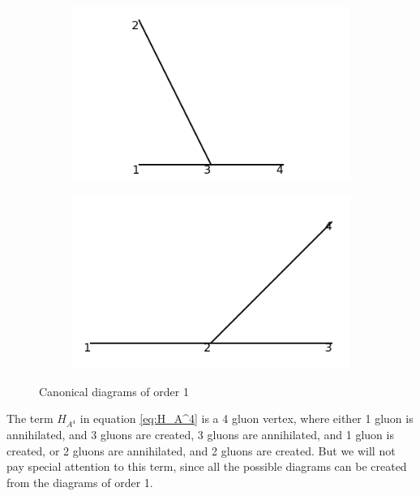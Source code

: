 \documentclass[11pt,a4paper,twoside,pdf]{article}
\numberwithin{equation}{section}
\begin{document}
\begin{figure}[h!]
    \centering
    \begin{subfigure}[t]{0.33\textwidth}
        \centering
        \includegraphics[width=\textwidth]{plots/canonical/order1/1.png}
        \caption{ }
    \end{subfigure}%
    \begin{subfigure}[t]{0.33\textwidth}
        \centering
        \includegraphics[width=\textwidth]{plots/canonical/order1/2.png}
        \caption{ }
    \end{subfigure}
    \caption{Canonical diagrams of order 1}
    \label{fig:cannonical1}
\end{figure}

The term $H_{A^4}$ in equation \eqref{eq:H_A^4} is a 4 gluon vertex, where either
1 gluon is annihilated, and 3 gluons are created, 3 gluons are annihilated, and
1 gluon is created, or 2 gluons are annihilated, and 2 gluons are created. But we 
will not pay special attention to this term, since all the possible diagrams can be 
created from the diagrams of order 1.
\end{document}
